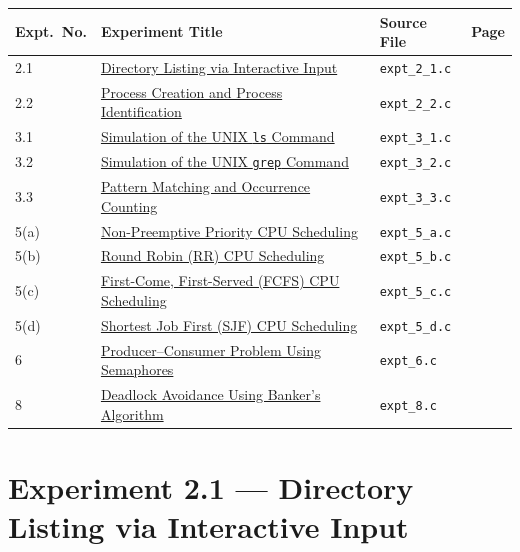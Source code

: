 \documentclass[11pt,a4paper]{article}
\newcommand{\exptheader}[3]{%
    \section[#1: #2]{#1 --- #2}%
    \label{#3}%
}
\begin{document}
\begin{center}
\small
\begin{tabular}{@{}lllr@{}}
    \toprule
    \textbf{Expt.\ No.} & \textbf{Experiment Title} & \textbf{Source File} & \textbf{Page} \\
    \midrule
    2.1  & \hyperref[exp:2.1]{Directory Listing via Interactive Input}          & \texttt{expt\_2\_1.c} & \pageref{exp:2.1} \\
    2.2  & \hyperref[exp:2.2]{Process Creation and Process Identification}      & \texttt{expt\_2\_2.c} & \pageref{exp:2.2} \\
    3.1  & \hyperref[exp:3.1]{Simulation of the UNIX \texttt{ls} Command}       & \texttt{expt\_3\_1.c} & \pageref{exp:3.1} \\
    3.2  & \hyperref[exp:3.2]{Simulation of the UNIX \texttt{grep} Command}     & \texttt{expt\_3\_2.c} & \pageref{exp:3.2} \\
    3.3  & \hyperref[exp:3.3]{Pattern Matching and Occurrence Counting}           & \texttt{expt\_3\_3.c} & \pageref{exp:3.3} \\
    5(a) & \hyperref[exp:5.a]{Non-Preemptive Priority CPU Scheduling}           & \texttt{expt\_5\_a.c} & \pageref{exp:5.a} \\
    5(b) & \hyperref[exp:5.b]{Round Robin (RR) CPU Scheduling}                  & \texttt{expt\_5\_b.c} & \pageref{exp:5.b} \\
    5(c) & \hyperref[exp:5.c]{First-Come, First-Served (FCFS) CPU Scheduling}     & \texttt{expt\_5\_c.c} & \pageref{exp:5.c} \\
    5(d) & \hyperref[exp:5.d]{Shortest Job First (SJF) CPU Scheduling}          & \texttt{expt\_5\_d.c} & \pageref{exp:5.d} \\
    6    & \hyperref[exp:6]{Producer--Consumer Problem Using Semaphores}        & \texttt{expt\_6.c}    & \pageref{exp:6} \\
    8    & \hyperref[exp:8]{Deadlock Avoidance Using Banker's Algorithm}          & \texttt{expt\_8.c}    & \pageref{exp:8} \\
    \bottomrule
\end{tabular}
\end{center}

\newpage

\exptheader{Experiment 2.1}{Directory Listing via Interactive Input}{exp:2.1}
\end{document}

